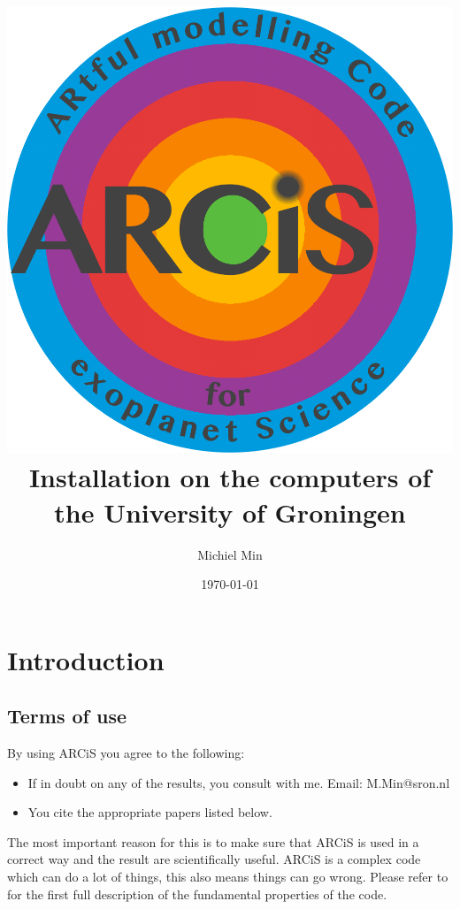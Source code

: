 \documentclass[12pt]{article}
\begin{document}
\title{\includegraphics[width=0.9\hsize]{ARCiS}\\Installation on the computers of the University of Groningen}
\author{Michiel Min}
\date{\today}
\maketitle

\section{Introduction}


\subsection{Terms of use}

By using ARCiS you agree to the following:
\begin{itemize}
\item If in doubt on any of the results, you consult with me. Email: M.Min@sron.nl
\item You cite the appropriate papers listed below.
\end{itemize}
The most important reason for this is to make sure that ARCiS is used in a correct way and the result are scientifically useful. ARCiS is a complex code which can do a lot of things, this also means things can go wrong. Please refer to \cite{2020A&A...642A..28M} for the first full description of the fundamental properties of the code.
\end{document}
